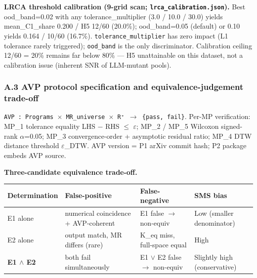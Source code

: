 \documentclass[review,12pt,authoryear]{elsarticle}
\newcounter{none}                   %
\begin{document}
\textbf{LRCA threshold calibration (9-grid scan;
\texttt{lrca\_calibration.json}).} Best ood\_band=0.02 with any
tolerance\_multiplier (3.0 / 10.0 / 30.0) yields mean\_C1\_share 0.200 /
H5 12/60 (20.0\%); ood\_band=0.05 (default) or 0.10 yields 0.164 / 10/60
(16.7\%). \texttt{tolerance\_multiplier} has zero impact (L1 tolerance
rarely triggered); \texttt{ood\_band} is the only discriminator.
Calibration ceiling 12/60 = 20\% remains far below 80\% --- H5
unattainable on this dataset, not a calibration issue (inherent SNR of
LLM-mutant pools).

\subsubsection{A.3 AVP protocol specification and equivalence-judgement
trade-off}\label{a.3-avp-protocol-specification-and-equivalence-judgement-trade-off}

\texttt{AVP\ :\ Programs\ $\times$\ MR\_universe\ $\times$\ R⁺\ $\to$\ \{pass,\ fail\}}.
Per-MP verification: MP\_1 tolerance equality \textbar LHS −
RHS\textbar{} $\leq$ $\varepsilon$; MP\_2 / MP\_5 Wilcoxon signed-rank $\alpha$=0.05; MP\_3
convergence-order + asymptotic residual ratio; MP\_4 DTW distance
threshold $\varepsilon$\_DTW. AVP version = P1 arXiv commit hash; P2 package embeds
AVP source.

\textbf{Three-candidate equivalence trade-off.}

{\def\LTcaptype{none} %
\begin{longtable}[]{@{}
  >{\raggedright\arraybackslash}p{}
  >{\raggedright\arraybackslash}p{}
  >{\raggedright\arraybackslash}p{}
  >{\raggedright\arraybackslash}p{}@{}}
\toprule\noalign{}
\begin{minipage}[b]{\linewidth}\raggedright
Determination
\end{minipage} & \begin{minipage}[b]{\linewidth}\raggedright
False-positive
\end{minipage} & \begin{minipage}[b]{\linewidth}\raggedright
False-negative
\end{minipage} & \begin{minipage}[b]{\linewidth}\raggedright
SMS bias
\end{minipage} \\
\midrule\noalign{}
\endhead
\bottomrule\noalign{}
\endlastfoot
E1 alone & numerical coincidence + AVP-coherent & E1 false $\to$ non-equiv &
Low (smaller denominator) \\
E2 alone & output match, MR differs (rare) & K\_eq miss, full-space
equal & High \\
\textbf{E1 $\wedge$ E2} & both fail simultaneously & E1 $\vee$ E2 false $\to$ non-equiv
& Slightly high (conservative) \\
\end{longtable}
}
\end{document}
